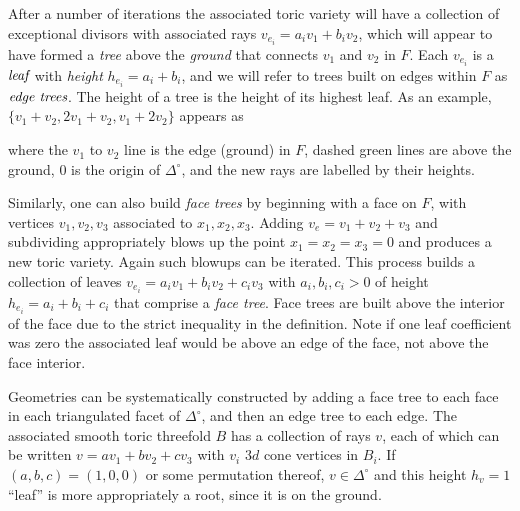 \documentclass[aps,prl,twocolumn, superscriptaddress,groupedaddress,nofootinbib]{revtex4-1}
\begin{document}
After a number of iterations the associated toric variety will have a
collection of exceptional divisors with associated rays $v_{e_i}=a_i v_1 + b_i
v_2$, which will appear to have formed a \emph{tree} above the \emph{ground}
that connects $v_1$ and $v_2$ in $F$. Each $v_{e_i}$ is a $\emph{leaf}$ with
\emph{height} $h_{e_i}=a_i+b_i$, and  we will refer to trees built on edges
within $F$ as $\emph{edge trees}$. The height of a tree is the height of its
highest leaf. As an example, $\{v_1+v_2,2v_1+v_2,v_1+2v_2\}$ appears as
\begin{center} 
\end{center} where the $v_1$ to $v_2$ line is the
edge (ground) in $F$, dashed green lines are above the ground, $0$ is the origin of $\Delta^\circ$, and the new rays
are labelled by their heights.

Similarly, one can also build \emph{face trees} by beginning with a face on
$F$, with vertices $v_1, v_2, v_3$ associated to $x_1, x_2, x_3$. Adding $v_e=v_1+v_2+v_3$ and subdividing
appropriately blows up the point $x_1=x_2=x_3=0$  and produces a new toric
variety. Again such blowups can be iterated. This process builds a collection
of leaves $v_{e_i}=a_i v_1 + b_i v_2 + c_i v_3$ with $a_i,b_i,c_i > 0$ of
height $h_{e_i}=a_i+b_i+c_i$ that comprise a \emph{face tree}. Face trees are
built above the interior of the face due to the strict inequality in the
definition. Note if one leaf coefficient was zero the associated leaf would be
above an edge of the face, not above the face interior.

Geometries can be systematically constructed by adding a face tree to each face in each triangulated facet of $\Delta^\circ$, and then an edge tree to each edge. The associated smooth toric
threefold $B$ has a collection of rays $v$, each of which can be written $v=av_1+bv_2+cv_3$ with $v_i$ $3d$ cone vertices in $B_i$. If $(a,b,c)=(1,0,0)$ or some
permutation thereof, $v\in \Delta^\circ$ and this height $h_v=1$ ``leaf'' is more
appropriately a root, since it is on the ground.
\end{document}
